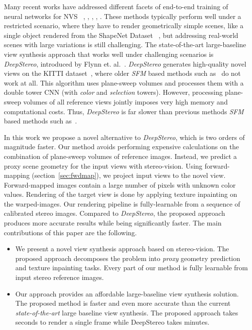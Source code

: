 \documentclass[runningheads]{llncs}
\begin{document}
Many recent works have addressed different facets of end-to-end training of neural networks for NVS ~\cite{dosovitskiy2015learning}, \cite{tatarchenko2016multi}, \cite{zhou2016view}, \cite{kulkarni2015deep}, \cite{yang2015weakly}. These methods typically perform well under a restricted scenario, where they have to render geometrically simple scenes, like a single object rendered from the ShapeNet Dataset ~\cite{shapenet}, but addressing real-world scenes with large variations is still challenging. The state-of-the-art large-baseline view synthesis approach that works well under challenging scenarios is \textit{DeepStereo}, 
introduced by Flynn et. al.~\cite{flynn2015deepstereo}. \textit{DeepStereo} generates high-quality novel views on the KITTI dataset~\cite{geiger2012we}, where older \textit{SFM} based methods such as~\cite{chaurasia2013depth} do not work at all. This algorithm uses plane-sweep volumes and processes them with a double tower CNN (with \textit{color} and \textit{selection} towers). However, processing plane-sweep volumes of all reference views jointly imposes very high memory and computational costs. Thus, \textit{DeepStereo} is far slower than previous methods \textit{SFM} based methods such as~\cite{chaurasia2013depth}.

In this work we propose a novel alternative to \textit{DeepStereo}, which is two orders of magnitude faster. Our method avoids performing expensive calculations on the combination of plane-sweep volumes of reference images. Instead, we predict a proxy scene geometry for the input views with stereo-vision. Using forward-mapping (section~\ref{sec:fwdmap}), 
we project input views to the novel view. Forward-mapped images contain a large number of pixels with unknown color values. Rendering of the target view is done by applying texture inpainting on the warped-images. Our rendering pipeline is fully-learnable from a sequence of calibrated stereo images. Compared to \textit{DeepStereo}, the proposed approach produces more accurate results while being significantly faster. The main contributions of this paper are the following.

\begin{itemize}
\item{We present a novel view synthesis approach based on stereo-vision. The proposed approach decomposes the problem into \textit{proxy} geometry prediction and texture inpainting tasks. Every part of our method is fully learnable from input stereo reference images.} 

\item{Our approach provides an affordable large-baseline view synthesis solution. The proposed method is faster and even more accurate than the current \textit{state-of-the-art} \cite{flynn2015deepstereo} large baseline view synthesis. The proposed approach takes seconds to render a single frame while DeepStereo \cite{flynn2015deepstereo} takes minutes.} 
\end{itemize}
\end{document}
